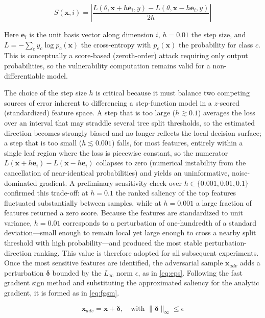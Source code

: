 \documentclass{iaesarticle}
\begin{document}
\begin{equation}\label{eq:fd}
S(\mathbf{x}, i) = \left| \frac{L(\theta, \mathbf{x} + h\mathbf{e}_i, y) - L(\theta, \mathbf{x} - h\mathbf{e}_i, y)}{2h} \right|
\end{equation}

Here $\mathbf{e}_i$ is the unit basis vector along dimension $i$, $h=0.01$ the step size, and $L=-\sum_c y_c \log p_c(\mathbf{x})$ the cross-entropy with $p_c(\mathbf{x})$ the probability for class $c$. This is conceptually a score-based (zeroth-order) attack requiring only output probabilities, so the vulnerability computation remains valid for a non-differentiable model.

The choice of the step size $h$ is critical because it must balance two competing sources of error inherent to differencing a step-function model in a $z$-scored (standardized) feature space. A step that is too large ($h\gtrsim0.1$) averages the loss over an interval that may straddle several tree split thresholds, so the estimated direction becomes strongly biased and no longer reflects the local decision surface; a step that is too small ($h\lesssim0.001$) falls, for most features, entirely within a single leaf region where the loss is piecewise constant, so the numerator $L(\mathbf{x}+h\mathbf{e}_i)-L(\mathbf{x}-h\mathbf{e}_i)$ collapses to zero (numerical instability from the cancellation of near-identical probabilities) and yields an uninformative, noise-dominated gradient. A preliminary sensitivity check over $h\in\{0.001, 0.01, 0.1\}$ confirmed this trade-off: at $h=0.1$ the ranked saliency of the top features fluctuated substantially between samples, while at $h=0.001$ a large fraction of features returned a zero score. Because the features are standardized to unit variance, $h=0.01$ corresponds to a perturbation of one-hundredth of a standard deviation---small enough to remain local yet large enough to cross a nearby split threshold with high probability---and produced the most stable perturbation-direction ranking. This value is therefore adopted for all subsequent experiments. Once the most sensitive features are identified, the adversarial sample $\mathbf{x}_{adv}$ adds a perturbation $\boldsymbol{\delta}$ bounded by the $L_\infty$ norm $\epsilon$, as in \eqref{eq:eps}. Following the fast gradient sign method \cite{51} and substituting the approximated saliency for the analytic gradient, it is formed as in \eqref{eq:fgsm}.

\begin{equation}\label{eq:eps}
\mathbf{x}_{adv} = \mathbf{x} + \boldsymbol{\delta}, \quad \text{with } \|\boldsymbol{\delta}\|_\infty \le \epsilon
\end{equation}
\end{document}

